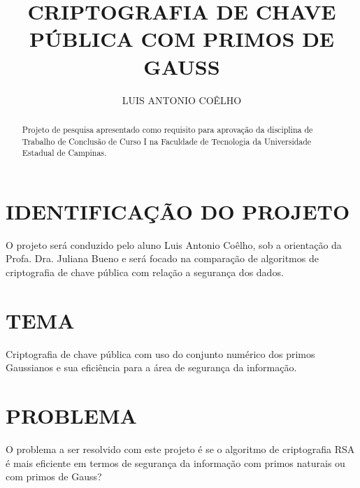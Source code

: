 \documentclass[]{article}
\title{CRIPTOGRAFIA DE CHAVE PÚBLICA COM PRIMOS DE GAUSS}
\author{LUIS ANTONIO COÊLHO}
\begin{document}
\maketitle

\begin{abstract}
Projeto de pesquisa apresentado como requisito para aprovação da disciplina de Trabalho de Conclusão de Curso I na Faculdade de Tecnologia da Universidade Estadual de Campinas. 
\end{abstract}

\section{IDENTIFICAÇÃO DO PROJETO}
O projeto será conduzido pelo aluno Luis Antonio Coêlho, sob a orientação da Profa. Dra. Juliana Bueno e será focado na comparação de algoritmos de criptografia de chave pública com relação a segurança dos dados.

\section{TEMA}
Criptografia de chave pública com uso do conjunto numérico dos primos Gaussianos e sua eficiência para a área de segurança da informação.

\section{PROBLEMA}
O problema a ser resolvido com este projeto é se o algoritmo de criptografia RSA é mais eficiente em termos de segurança da informação com primos naturais ou com primos de Gauss? 
\end{document}
